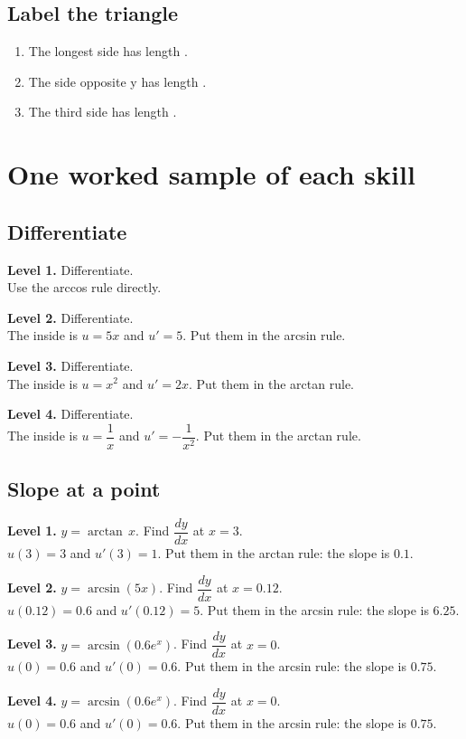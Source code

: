 \documentclass[11pt]{article}
\begin{document}
\subsection*{Label the triangle}
\begin{enumerate}
\item The longest side has length .
\item The side opposite y has length .
\item The third side has length .
\end{enumerate}
\section*{One worked sample of each skill}
\subsection*{Differentiate}
\noindent\textbf{Level 1.} Differentiate.\\  \quad Use the arccos rule directly.\par\medskip
\noindent\textbf{Level 2.} Differentiate.\\  \quad The inside is $u=5x$ and $u'=5$. Put them in the arcsin rule.\par\medskip
\noindent\textbf{Level 3.} Differentiate.\\  \quad The inside is $u=x^{2}$ and $u'=2x$. Put them in the arctan rule.\par\medskip
\noindent\textbf{Level 4.} Differentiate.\\  \quad The inside is $u=\dfrac1x$ and $u'=-\dfrac1{x^2}$. Put them in the arctan rule.\par\medskip
\subsection*{Slope at a point}
\noindent\textbf{Level 1.} $y=\arctan\,x$. Find $\dfrac{dy}{dx}$ at $x=3$.\\  \quad $u(3)=3$ and $u'(3)=1$. Put them in the arctan rule: the slope is $0.1$.\par\medskip
\noindent\textbf{Level 2.} $y=\arcsin\left(5x\right)$. Find $\dfrac{dy}{dx}$ at $x=0.12$.\\  \quad $u(0.12)=0.6$ and $u'(0.12)=5$. Put them in the arcsin rule: the slope is $6.25$.\par\medskip
\noindent\textbf{Level 3.} $y=\arcsin\left(0.6e^{x}\right)$. Find $\dfrac{dy}{dx}$ at $x=0$.\\  \quad $u(0)=0.6$ and $u'(0)=0.6$. Put them in the arcsin rule: the slope is $0.75$.\par\medskip
\noindent\textbf{Level 4.} $y=\arcsin\left(0.6e^{x}\right)$. Find $\dfrac{dy}{dx}$ at $x=0$.\\  \quad $u(0)=0.6$ and $u'(0)=0.6$. Put them in the arcsin rule: the slope is $0.75$.\par\medskip
\end{document}
